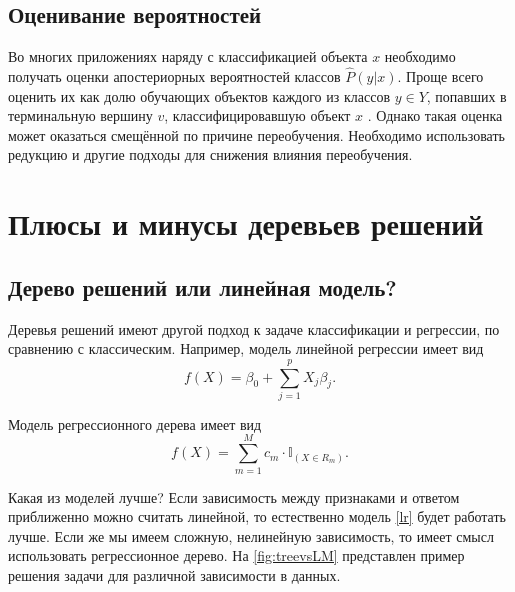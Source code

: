 \documentclass[14pt, a4paper]{article}
\begin{document}
\subsection{Оценивание вероятностей}
Во многих приложениях наряду с классификацией объекта $x$ необходимо получать оценки апостериорных вероятностей классов $\hat{P}(y|x)$. Проще всего оценить их как долю обучающих объектов каждого из классов $y \in Y$, попавших в терминальную вершину $v$, классифицировавшую объект $x$ . Однако такая оценка может оказаться смещённой по причине переобучения. Необходимо использовать редукцию и другие подходы для снижения влияния переобучения.

\section{Плюсы и минусы деревьев решений}
\subsection{Дерево решений или линейная модель?}

Деревья решений имеют другой подход к задаче классификации и регрессии, по сравнению с классическим.
Например, модель линейной регрессии имеет вид
\begin{equation}
\label{lr}
f(X)  = \beta_0 + \sum_{j = 1}^pX_j\beta_j.
\end{equation} 

Модель регрессионного дерева имеет вид
\begin{equation}
f(X) = \sum_{m = 1}^M c_m \cdot \mathbb{I}_{(X \in R_m)}.
\end{equation}

Какая из моделей лучше? Если зависимость между признаками и ответом приближенно можно считать линейной, то естественно модель \eqref{lr} будет работать лучше. Если же мы имеем сложную, нелинейную зависимость, то имеет смысл использовать регрессионное дерево. На \ref{fig:treevsLM} представлен пример решения задачи для различной зависимости в данных.
\end{document}
